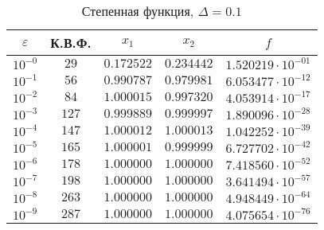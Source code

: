 \documentclass[a4paper,12pt,notitlepage,pdftex,headsepline]{scrartcl}
\begin{document}
        \begin{table}[ht]
          \centering
          \caption{Степенная функция, $\Delta = 0.1$}
          \begin{tabular}{|c|c|c|c|c|}
            \hline
            $\varepsilon$ & К.В.Ф. & $x_1$ & $x_2$ & $f$\\
            \hline
            $10^{-0}$ & $29$ & $0.172522$ & $0.234442$ & $1.520219\cdot 10^{-01}$\\
            $10^{-1}$ & $56$ & $0.990787$ & $0.979981$ & $6.053477\cdot 10^{-12}$\\
            $10^{-2}$ & $84$ & $1.000015$ & $0.997320$ & $4.053914\cdot 10^{-17}$\\
            $10^{-3}$ & $127$ & $0.999889$ & $0.999997$ & $1.890096\cdot 10^{-28}$\\
            $10^{-4}$ & $147$ & $1.000012$ & $1.000013$ & $1.042252\cdot 10^{-39}$\\
            $10^{-5}$ & $165$ & $1.000001$ & $0.999999$ & $6.727702\cdot 10^{-42}$\\
            $10^{-6}$ & $178$ & $1.000000$ & $1.000000$ & $7.418560\cdot 10^{-52}$\\
            $10^{-7}$ & $198$ & $1.000000$ & $1.000000$ & $3.641494\cdot 10^{-57}$\\
            $10^{-8}$ & $263$ & $1.000000$ & $1.000000$ & $4.948449\cdot 10^{-64}$\\
            $10^{-9}$ & $287$ & $1.000000$ & $1.000000$ & $4.075654\cdot 10^{-76}$\\
            \hline
          \end{tabular}
        \end{table}
\end{document}
